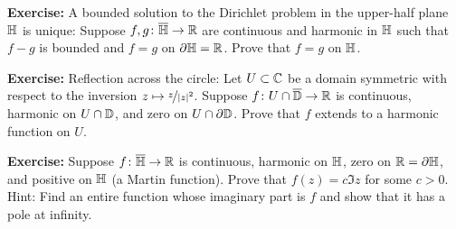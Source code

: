 \documentclass[10pt,aspectratio=169]{beamer}
\begin{document}
\begin{frame}
\textbf{Exercise:}
A bounded solution to
the Dirichlet problem in the upper-half plane ${\mathbb{H}}$ is unique:
Suppose $f,g \colon \overline{{\mathbb{H}}} \to {\mathbb{R}}$ are 
continuous and harmonic in ${\mathbb{H}}$ such that $f-g$ is bounded and
$f=g$ on $\partial {\mathbb{H}} = {\mathbb{R}}$.  Prove that $f=g$ on ${\mathbb{H}}$.

\medskip
\pause

\textbf{Exercise:}
Reflection across the circle:  Let $U \subset
{\mathbb{C}}$ be a domain symmetric with respect to the inversion $z \mapsto
\nicefrac{z}{\left\lvert {z} \right\rvert^2}$.
Suppose $f \colon U \cap \overline{{\mathbb{D}}} \to {\mathbb{R}}$
is continuous, harmonic on $U \cap {\mathbb{D}}$, and
zero on $U \cap \partial {\mathbb{D}}$.
Prove that $f$ extends to a harmonic function on $U$.

\medskip
\pause

\textbf{Exercise:}
Suppose $f \colon \overline{{\mathbb{H}}} \to {\mathbb{R}}$ is continuous, harmonic on ${\mathbb{H}}$, zero on ${\mathbb{R}} = \partial {\mathbb{H}}$,
and positive on ${\mathbb{H}}$  (a Martin function).
Prove that $f(z) = c \Im z$ for some $c > 0$.
Hint: Find an entire function whose imaginary part is $f$ and
show that it has a pole at infinity.

\end{frame}
\end{document}
